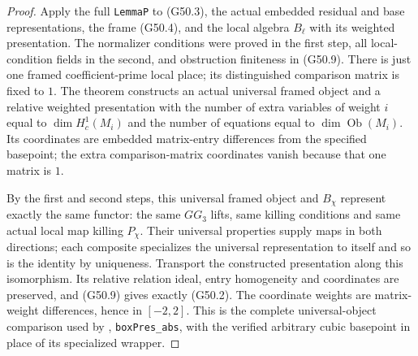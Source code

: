 \begin{proof}
Apply the full \texttt{LemmaP} to (G50.3), the actual
embedded residual and base representations, the frame
(G50.4), and the local algebra $B_\ell$ with its
weighted presentation.  The normalizer conditions were
proved in the first step, all local-condition fields in
the second, and obstruction finiteness in (G50.9).
There is just one framed coefficient-prime local place;
its distinguished comparison matrix is fixed to $1$.
The theorem constructs an actual universal framed object
and a relative weighted presentation with the number of
extra variables of weight $i$ equal to $\dim H^1_c(M_i)$
and the number of equations equal to
$\dim\operatorname{Ob}(M_i)$.
Its coordinates are embedded matrix-entry differences
from the specified basepoint; the extra comparison-matrix
coordinates vanish because that one matrix is $1$.

By the first and second steps, this universal framed
object and $B_\chi$ represent exactly the same functor:
the same $GG_3$ lifts, same killing conditions and same
actual local map killing $P_\chi$.
Their universal properties supply maps in both directions;
each composite specializes the universal representation
to itself and so is the identity by uniqueness.
Transport the constructed presentation along this
isomorphism.  Its relative relation ideal, entry
homogeneity and coordinates are preserved, and (G50.9)
gives exactly (G50.2).  The coordinate weights are
matrix-weight differences, hence in $[-2,2]$.
This is the complete universal-object comparison used
by ,
\texttt{boxPres\_abs}, with the verified arbitrary cubic
basepoint in place of its specialized wrapper.
\end{proof}


